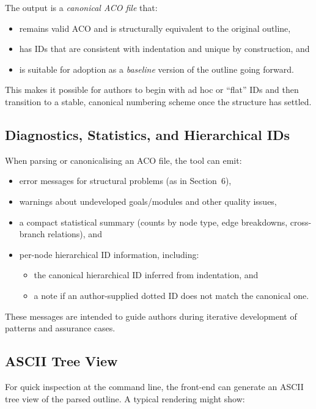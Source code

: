\documentclass[11pt]{article}
\begin{document}
The output is a \emph{canonical ACO file} that:
\begin{itemize}[leftmargin=2em]
  \item remains valid ACO and is structurally equivalent to the original outline,
  \item has IDs that are consistent with indentation and unique by construction, and
  \item is suitable for adoption as a \emph{baseline} version of the outline going forward.
\end{itemize}

This makes it possible for authors to begin with ad hoc or ``flat'' IDs and then transition to a stable, canonical numbering scheme once the structure has settled.

\subsection*{Diagnostics, Statistics, and Hierarchical IDs}

When parsing or canonicalising an ACO file, the tool can emit:
\begin{itemize}[leftmargin=2em]
  \item error messages for structural problems (as in Section~6),
  \item warnings about undeveloped goals/modules and other quality issues,
  \item a compact statistical summary (counts by node type, edge breakdowns, cross-branch relations), and
  \item per-node hierarchical ID information, including:
    \begin{itemize}[leftmargin=1.5em]
      \item the canonical hierarchical ID inferred from indentation, and
      \item a note if an author-supplied dotted ID does not match the canonical one.
    \end{itemize}
\end{itemize}

These messages are intended to guide authors during iterative development of patterns and assurance cases.

\subsection*{ASCII Tree View}

For quick inspection at the command line, the front-end can generate an ASCII tree view of the parsed outline. A typical rendering might show:
\end{document}
